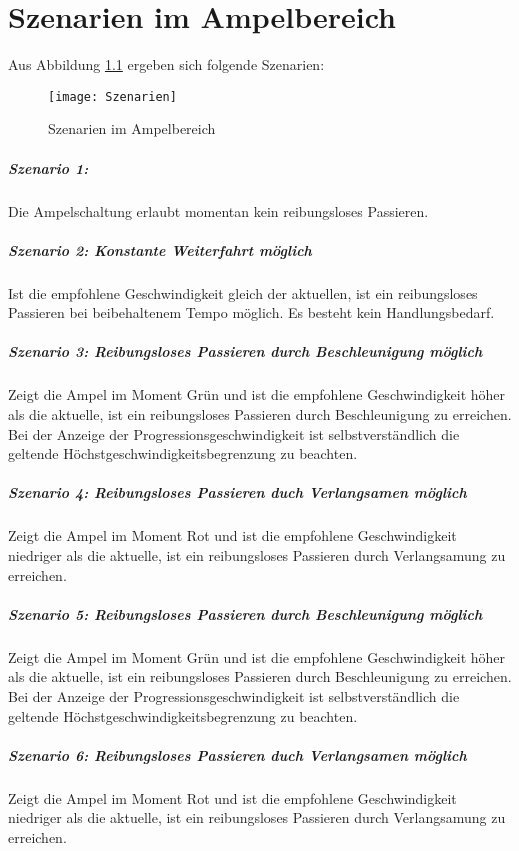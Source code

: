 \chapter{Szenarien im Ampelbereich}
Aus Abbildung \ref{fig:szenarien} ergeben sich folgende Szenarien: 
\begin{figure}[H]  
    \centering  
    \texttt{[image: Szenarien]} 
    \caption[Szenarien]{Szenarien im Ampelbereich}
    \label{fig:szenarien}
\end{figure}
\paragraph{Szenario 1:} 
Die Ampelschaltung erlaubt momentan kein reibungsloses Passieren. 
\paragraph{Szenario 2: Konstante Weiterfahrt möglich} 
Ist die empfohlene Geschwindigkeit gleich der aktuellen, ist ein reibungsloses Passieren bei beibehaltenem Tempo möglich. Es besteht kein Handlungsbedarf. 
\paragraph{Szenario 3: Reibungsloses Passieren durch Beschleunigung möglich} 
Zeigt die Ampel im Moment Grün und ist die empfohlene Geschwindigkeit höher als die aktuelle, ist ein reibungsloses Passieren durch Beschleunigung zu erreichen. Bei der Anzeige der Progressionsgeschwindigkeit ist selbstverständlich die geltende Höchstgeschwindigkeitsbegrenzung zu beachten. 
\paragraph{Szenario 4: Reibungsloses Passieren duch Verlangsamen möglich} 
Zeigt die Ampel im Moment Rot und ist die empfohlene Geschwindigkeit niedriger als die aktuelle, ist ein reibungsloses Passieren durch Verlangsamung zu erreichen.
\paragraph{Szenario 5: Reibungsloses Passieren durch Beschleunigung möglich} 
Zeigt die Ampel im Moment Grün und ist die empfohlene Geschwindigkeit höher als die aktuelle, ist ein reibungsloses Passieren durch Beschleunigung zu erreichen. Bei der Anzeige der Progressionsgeschwindigkeit ist selbstverständlich die geltende Höchstgeschwindigkeitsbegrenzung zu beachten. 
\paragraph{Szenario 6: Reibungsloses Passieren duch Verlangsamen möglich} 
Zeigt die Ampel im Moment Rot und ist die empfohlene Geschwindigkeit niedriger als die aktuelle, ist ein reibungsloses Passieren durch Verlangsamung zu erreichen.
